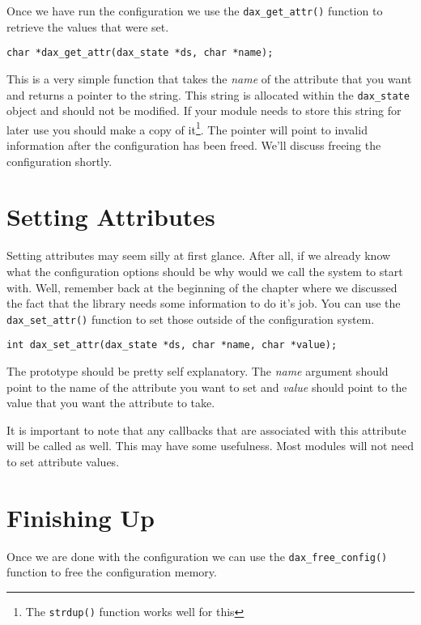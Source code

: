 Once we have run the configuration we use the \verb|dax_get_attr()| function to retrieve the values that were set.

\begin{verbatim}
char *dax_get_attr(dax_state *ds, char *name);
\end{verbatim}

This is a very simple function that takes the \textit{name} of the attribute that you want and returns a pointer to the string.  This string is allocated within the \verb|dax_state| object and should not be modified.  If your module needs to store this string for later use you should make a copy of it\footnote{The \texttt{strdup()} function works well for this}.  The pointer will point to invalid information after the configuration has been freed.  We'll discuss freeing the configuration shortly.

\section{Setting Attributes} 

Setting attributes may seem silly at first glance.  After all, if we already know what the configuration options should be why would we call the system to start with.  Well, remember back at the beginning of the chapter where we discussed the fact that the library needs some information to do it's job.  You can use the \verb|dax_set_attr()| function to set those outside of the configuration system.

\begin{verbatim}
int dax_set_attr(dax_state *ds, char *name, char *value);
\end{verbatim}

The prototype should be pretty self explanatory.  The \textit{name} argument should point to the name of the attribute you want to set and \textit{value} should point to the value that you want the attribute to take.

It is important to note that any callbacks that are associated with this attribute will be called as well.  This may have some usefulness.  Most modules will not need to set attribute values.

\section{Finishing Up}

Once we are done with the configuration we can use the \verb|dax_free_config()| function to free the configuration memory.

